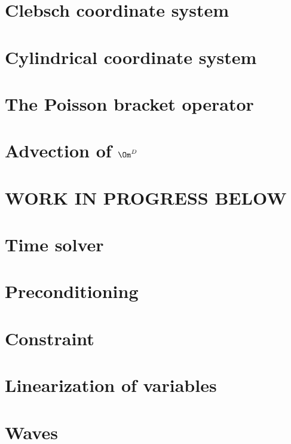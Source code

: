 \documentclass[12pt,a4paper,oneside,openright]{report} %
\begin{document}
\chapter{Clebsch coordinate system}
\label{app:Clebsch}


\chapter{Cylindrical coordinate system}
\label{app:cylcoord}


\chapter{The Poisson bracket operator}
\label{app:poisson}


\chapter{Advection of \texorpdfstring{$\Om^D$}{OmegaD}}
\label{app:vortDAdv}


\chapter{WORK IN PROGRESS BELOW}

\chapter{Time solver}
\label{app:timeSolver}


\chapter{Preconditioning}
\label{app:precon}


\chapter{Constraint}


\chapter{Linearization of variables}
\label{app:linearized}


\chapter{Waves}
\label{app:waves}




\end{document}
